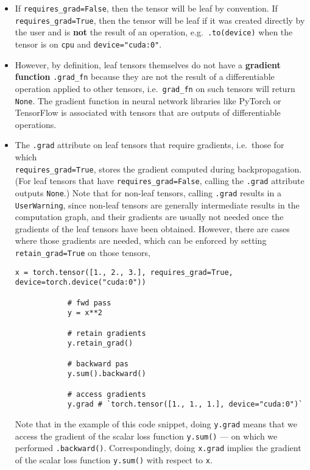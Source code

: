 \documentclass[12pt, a4paper]{scrbook}
\numberwithin{equation}{section}
\theoremstyle{definition}
\theoremstyle{definition}
\begin{document}
	\begin{itemize}
		\item If \texttt{requires\_grad=False}, then the tensor will be leaf by convention. If \texttt{requires\_grad=True}, then the tensor will be leaf if it was created directly by the user and is \textbf{not} the result of an operation, e.g.~\texttt{.to(device)} when the tensor is on \texttt{cpu} and \texttt{device="cuda:0"}.
		
		\item However, by definition, leaf tensors themselves do not have a \textbf{gradient function} \texttt{.grad\_fn} \mbox{because} they are not the result of a differentiable operation applied to other tensors, i.e.~\texttt{grad\_fn} on such tensors will return \texttt{None}. The gradient function in neural network libraries like PyTorch or TensorFlow is associated with tensors that are outputs of differentiable operations.
		
		\item The \texttt{.grad} attribute on leaf tensors that require gradients, i.e.~those for which \\ \texttt{requires\_grad=True}, stores the gradient computed during backpropagation. (For leaf tensors that have \texttt{requires\_grad=False}, calling the \texttt{.grad} attribute outputs \texttt{None}.) Note that for non-leaf tensors, calling \texttt{.grad} results in a \texttt{UserWarning}, since non-leaf tensors are generally intermediate results in the computation graph, and their gradients are usually not needed once the gradients of the leaf tensors have been obtained. However, there are cases where those gradients are needed, which can be enforced by setting \texttt{retain\_grad=True} on those tensors,
		
		\begin{lstlisting}[style=mystylepython, label=alg:retain_grad, xleftmargin=\parindent]
			x = torch.tensor([1., 2., 3.], requires_grad=True, device=torch.device("cuda:0"))
			
			# fwd pass
			y = x**2
			
			# retain gradients
			y.retain_grad()
			
			# backward pas
			y.sum().backward()
			
			# access gradients
			y.grad # `torch.tensor([1., 1., 1.], device="cuda:0")`
		\end{lstlisting}
		
		Note that in the example of this code snippet, doing \texttt{y.grad} means that we access the gradient of the scalar loss function \texttt{y.sum()} --- on which we performed \texttt{.backward()}. Correspondingly, doing \texttt{x.grad} implies the gradient of the scalar loss function \texttt{y.sum()} with respect to \texttt{x}.
		

\end{itemize}
\end{document}
